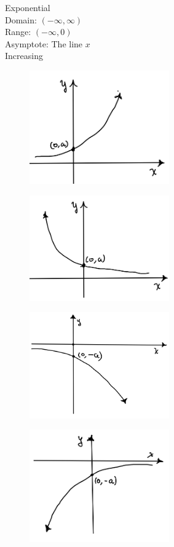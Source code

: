 \begin{multicols}{2}
\begin{center}
        Exponential\\
        Domain: $(-\infty, \infty)$\\
        Range: $(-\infty, 0)$\\
        Asymptote: The line $x$\\
        Increasing
        \vspace{5mm}
    \end{center}
    \hline
    \begin{figure}[H]
        \centering
        \includegraphics[width=6cm]{images/fig1}
    \end{figure}
    \begin{figure}[H]
        \centering
        \includegraphics[width=6cm]{images/fig2}
    \end{figure}
    \begin{figure}[H]
        \centering
        \includegraphics[width=6cm]{images/fig3}
    \end{figure}
    \begin{figure}[H]
        \centering
        \includegraphics[width=6cm]{images/fig4}

\end{figure}
\end{multicols}
